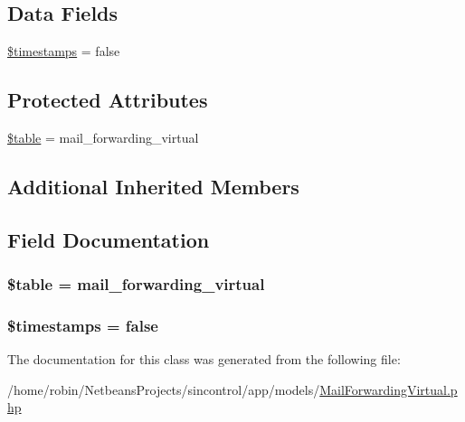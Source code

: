 \subsection*{Data Fields}
\begin{DoxyCompactItemize}
\item 
\hyperlink{class_mail_forwarding_virtual_a51267c24c8fae742ed8f9be0ba6085ee}{\$timestamps} = false
\end{DoxyCompactItemize}
\subsection*{Protected Attributes}
\begin{DoxyCompactItemize}
\item 
\hyperlink{class_mail_forwarding_virtual_ae8876a14058f368335baccf35af4a22b}{\$table} = \textquotesingle{}mail\+\_\+forwarding\+\_\+virtual\textquotesingle{}
\end{DoxyCompactItemize}
\subsection*{Additional Inherited Members}


\subsection{Field Documentation}
\hypertarget{class_mail_forwarding_virtual_ae8876a14058f368335baccf35af4a22b}{}
\subsubsection[{\$table}]{\setlength{\rightskip}{0pt plus 5cm}\$table = \textquotesingle{}mail\+\_\+forwarding\+\_\+virtual\textquotesingle{}\hspace{0.3cm}{\ttfamily [protected]}}\label{class_mail_forwarding_virtual_ae8876a14058f368335baccf35af4a22b}
\hypertarget{class_mail_forwarding_virtual_a51267c24c8fae742ed8f9be0ba6085ee}{}
\subsubsection[{\$timestamps}]{\setlength{\rightskip}{0pt plus 5cm}\$timestamps = false}\label{class_mail_forwarding_virtual_a51267c24c8fae742ed8f9be0ba6085ee}


The documentation for this class was generated from the following file\+:\begin{DoxyCompactItemize}
\item 
/home/robin/\+Netbeans\+Projects/sincontrol/app/models/\hyperlink{_mail_forwarding_virtual_8php}{Mail\+Forwarding\+Virtual.\+php}\end{DoxyCompactItemize}
